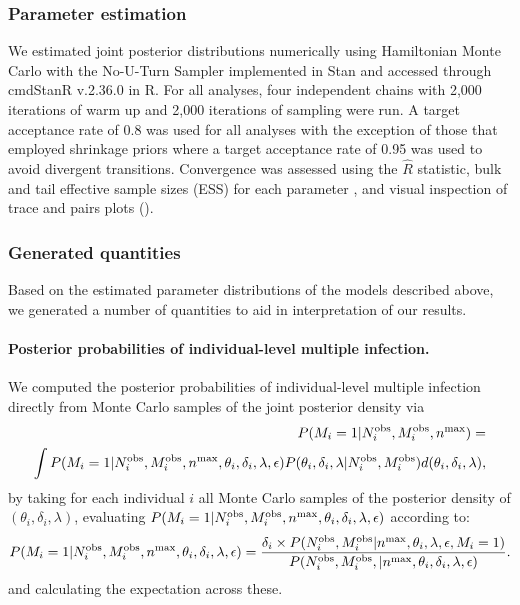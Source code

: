 \documentclass[10pt,letterpaper]{article}
\newcommand{\MI}{M^{\text{\text{obs}}}}
\begin{document}
\subsubsection{Parameter estimation}
We estimated joint posterior distributions numerically using Hamiltonian Monte Carlo \cite{betancourt2013} with the No-U-Turn Sampler \cite{hoffman2014} implemented in Stan \cite{stan2024} and accessed through cmdStanR v.2.36.0 \cite{gabry2023} in R. For all analyses, four independent chains with 2,000 iterations of warm up and 2,000 iterations of sampling were run. A target acceptance rate of 0.8 was used for all analyses with the exception of those that employed shrinkage priors where a target acceptance rate of 0.95 was used to avoid divergent transitions. Convergence was assessed using the $\hat{R}$ statistic, bulk and tail effective sample sizes (ESS) for each parameter \cite{vehtari2021}, and visual inspection of trace and pairs plots (). \par

\subsubsection{Generated quantities}
\setcounter{secnumdepth}{4}
Based on the estimated parameter distributions of the models described above, we generated a number of quantities to aid in interpretation of our results. 

\paragraph{Posterior probabilities of individual-level multiple infection.}
We computed the posterior probabilities of individual-level multiple infection directly from Monte Carlo samples of the joint posterior density via
\begin{equation}
\label{eq:ind_prob_mi}
\begin{split}
P(M_i = 1 | N^{\text{obs}}_i, \MI_i, {n^{\text{max}}}) = \\
\int P(M_i = 1 | N^{\text{obs}}_i, \MI_i, {n^{\text{max}}}, \theta_i, \delta_i, \lambda, \epsilon)P(\theta_i, \delta_i, \lambda | N^{\text{obs}}_i, \MI_i)d (\theta_i,\delta_i,\lambda),
\end{split}
\end{equation}
by taking for each individual $i$ all Monte Carlo samples of the posterior density of $(\theta_i, \delta_i, \lambda)$, evaluating $P(M_i = 1 | N^{\text{obs}}_i, \MI_i, {n^{\text{max}}}, \theta_i, \delta_i, \lambda, \epsilon)$ according to:
\begin{equation}
P(M_i = 1 | N^{\text{obs}}_i, \MI_i, {n^{\text{max}}}, \theta_i, \delta_i, \lambda, \epsilon) = \frac{\delta_i \times P(N^{\text{obs}}_i, \MI_i | {n^{\text{max}}}, \theta_i, \lambda, \epsilon, M_i = 1)}{P(N^{\text{obs}}_i, \MI_i, | {n^{\text{max}}}, \theta_i, \delta_i,  \lambda, \epsilon)}. 
\end{equation}
and calculating the expectation across these. 
\end{document}
